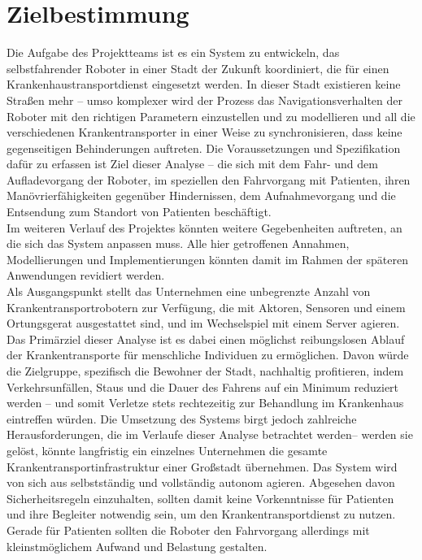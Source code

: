 
\section{Zielbestimmung}
Die Aufgabe des Projektteams ist es ein System zu entwickeln, das selbstfahrender Roboter in einer Stadt der Zukunft koordiniert, die für einen Krankenhaustransportdienst eingesetzt werden. In dieser Stadt existieren keine Straßen mehr – umso komplexer wird der Prozess das Navigationsverhalten der Roboter mit den richtigen Parametern einzustellen und zu modellieren und all die verschiedenen Krankentransporter in einer Weise zu synchronisieren, dass keine gegenseitigen Behinderungen auftreten. Die Voraussetzungen und Spezifikation dafür zu erfassen ist Ziel dieser Analyse – die sich mit dem Fahr- und dem Aufladevorgang der Roboter, im speziellen den Fahrvorgang mit Patienten, ihren Manövrierfähigkeiten gegenüber Hindernissen, dem Aufnahmevorgang und die Entsendung zum Standort von Patienten beschäftigt.\\

Im weiteren Verlauf des Projektes könnten weitere Gegebenheiten auftreten, an die sich das System anpassen muss. Alle hier getroffenen Annahmen, Modellierungen und Implementierungen könnten damit im Rahmen der späteren Anwendungen revidiert werden.\\

Als Ausgangspunkt stellt das Unternehmen eine unbegrenzte Anzahl von Krankentransportrobotern zur Verfügung, die mit Aktoren, Sensoren und einem Ortungsgerat ausgestattet sind, und im Wechselspiel mit einem Server agieren.\\

Das Primärziel dieser Analyse ist es dabei einen möglichst reibungslosen Ablauf der Krankentransporte für menschliche Individuen zu ermöglichen. Davon würde die Zielgruppe, spezifisch die Bewohner der Stadt, nachhaltig profitieren, indem Verkehrsunfällen, Staus und die Dauer des Fahrens auf ein Minimum reduziert werden – und somit Verletze stets rechtezeitig zur Behandlung im Krankenhaus eintreffen würden. Die Umsetzung des Systems birgt jedoch zahlreiche Herausforderungen, die im Verlaufe dieser Analyse betrachtet werden– werden sie gelöst, könnte langfristig ein einzelnes Unternehmen die gesamte Krankentransportinfrastruktur einer Großstadt übernehmen. Das System wird von sich aus selbstständig und vollständig autonom agieren. Abgesehen davon Sicherheitsregeln einzuhalten, sollten damit keine Vorkenntnisse für Patienten und ihre Begleiter notwendig sein, um den Krankentransportdienst zu nutzen. Gerade für Patienten sollten die Roboter den Fahrvorgang allerdings mit kleinstmöglichem Aufwand und Belastung gestalten.\\\\

